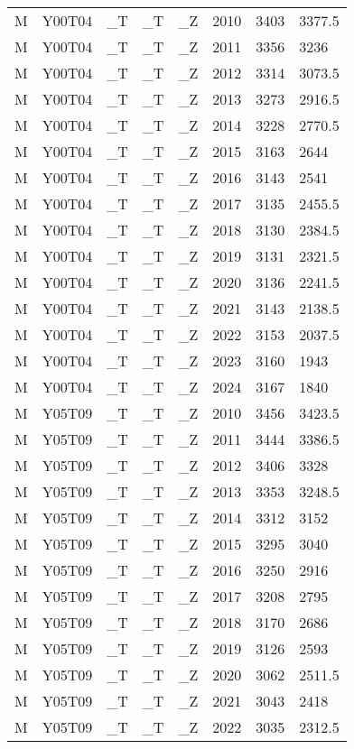 \begin{longtable}[t]{llllllll}
\addlinespace
M & Y00T04 & \_T & \_T & \_Z & 2010 & 3403 & 3377.5\\
M & Y00T04 & \_T & \_T & \_Z & 2011 & 3356 & 3236\\
M & Y00T04 & \_T & \_T & \_Z & 2012 & 3314 & 3073.5\\
M & Y00T04 & \_T & \_T & \_Z & 2013 & 3273 & 2916.5\\
M & Y00T04 & \_T & \_T & \_Z & 2014 & 3228 & 2770.5\\
\addlinespace
M & Y00T04 & \_T & \_T & \_Z & 2015 & 3163 & 2644\\
M & Y00T04 & \_T & \_T & \_Z & 2016 & 3143 & 2541\\
M & Y00T04 & \_T & \_T & \_Z & 2017 & 3135 & 2455.5\\
M & Y00T04 & \_T & \_T & \_Z & 2018 & 3130 & 2384.5\\
M & Y00T04 & \_T & \_T & \_Z & 2019 & 3131 & 2321.5\\
\addlinespace
M & Y00T04 & \_T & \_T & \_Z & 2020 & 3136 & 2241.5\\
M & Y00T04 & \_T & \_T & \_Z & 2021 & 3143 & 2138.5\\
M & Y00T04 & \_T & \_T & \_Z & 2022 & 3153 & 2037.5\\
M & Y00T04 & \_T & \_T & \_Z & 2023 & 3160 & 1943\\
M & Y00T04 & \_T & \_T & \_Z & 2024 & 3167 & 1840\\
\addlinespace
M & Y05T09 & \_T & \_T & \_Z & 2010 & 3456 & 3423.5\\
M & Y05T09 & \_T & \_T & \_Z & 2011 & 3444 & 3386.5\\
M & Y05T09 & \_T & \_T & \_Z & 2012 & 3406 & 3328\\
M & Y05T09 & \_T & \_T & \_Z & 2013 & 3353 & 3248.5\\
M & Y05T09 & \_T & \_T & \_Z & 2014 & 3312 & 3152\\
\addlinespace
M & Y05T09 & \_T & \_T & \_Z & 2015 & 3295 & 3040\\
M & Y05T09 & \_T & \_T & \_Z & 2016 & 3250 & 2916\\
M & Y05T09 & \_T & \_T & \_Z & 2017 & 3208 & 2795\\
M & Y05T09 & \_T & \_T & \_Z & 2018 & 3170 & 2686\\
M & Y05T09 & \_T & \_T & \_Z & 2019 & 3126 & 2593\\
\addlinespace
M & Y05T09 & \_T & \_T & \_Z & 2020 & 3062 & 2511.5\\
M & Y05T09 & \_T & \_T & \_Z & 2021 & 3043 & 2418\\
M & Y05T09 & \_T & \_T & \_Z & 2022 & 3035 & 2312.5\\

\end{longtable}
